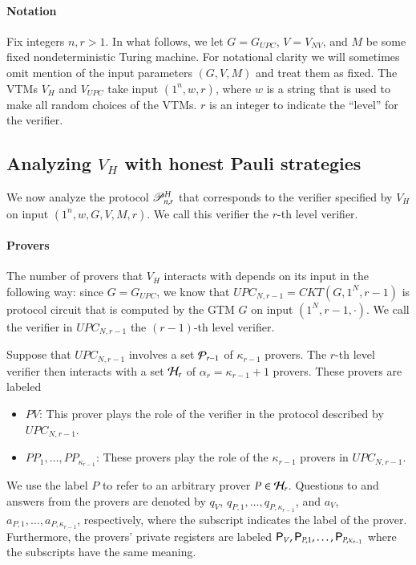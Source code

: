 \paragraph{Notation} 
Fix integers $n, r > 1$. In what follows, we let $G = G_{UPC}$, $V = V_{NV}$, and $M$ be some fixed nondeterministic Turing machine. For notational clarity we will sometimes omit mention of the input parameters $(G,V,M)$ and treat them as fixed. The VTMs $V_H$ and $V_{UPC}$ take input $(1^n,w,r)$, where $w$ is a string that is used to make all random choices of the VTMs. $r$ is an integer to indicate the ``level'' for the verifier. 


\subsection{Analyzing $V_H$ with honest Pauli strategies}

We now analyze the protocol $\mathscr{P}_{n,r}^H$ that corresponds to the verifier specified by $V_H$ on input $(1^n,w,G,V,M,r)$. We call this verifier the $r$-th level verifier. 

\paragraph{Provers}
The number of provers that $V_H$ interacts with depends on its input in the following way: since $G = G_{UPC}$, we know that $UPC_{N,r-1} = CKT(G,1^N,r-1)$ is protocol circuit that is computed by the GTM $G$ on input $(1^N,r-1,\cdot)$. We call the verifier in $UPC_{N,r-1}$ the $(r-1)$-th level verifier.

Suppose that $UPC_{N,r-1}$ involves a set $\mathcal P_{r-1}$ of $\kappa_{r-1}$ provers. The $r$-th level verifier then interacts with a set $\mathcal H_r$ of $\alpha_r = \kappa_{r-1} + 1$ provers. These provers are labeled
\begin{itemize}
	\item $PV$: This prover plays the role of the verifier in the protocol described by $UPC_{N,r-1}$. 
	\item $PP_1,\ldots,PP_{\kappa_{r-1}}$: These provers play the role of the $\kappa_{r-1}$ provers in $UPC_{N,r-1}$.
\end{itemize}
We use the label $P$ to refer to an arbitrary prover $P\in\mathcal H_r$. Questions to and answers from the provers are denoted  by $q_V$, $q_{P,1},\ldots,q_{P,\kappa_{r-1}}$, and $a_V$, $a_{P,1},\ldots,a_{P,\kappa_{r-1}}$, respectively, where the subscript indicates the label of the prover. Furthermore, the provers' private registers are labeled ${\mathsf{P}}_V, {\mathsf{P}}_{P,1},\ldots,{\mathsf{P}}_{P,\kappa_{r-1}}$ where the subscripts have the same meaning.

